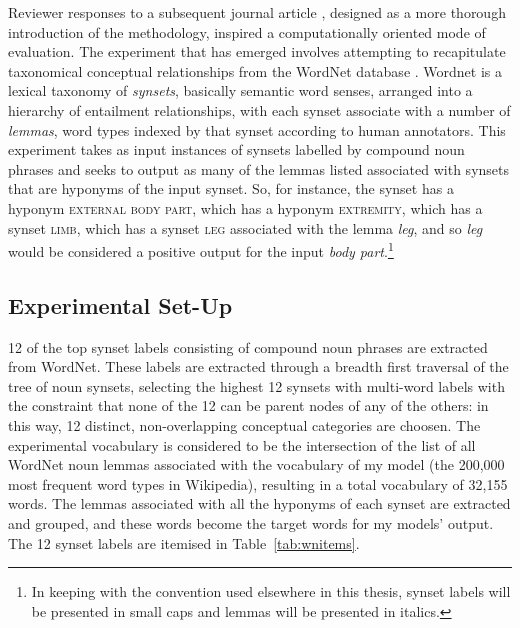 Reviewer responses to a subsequent journal article \citep{McGregorEA2015c}, designed as a more thorough introduction of the methodology, inspired a computationally oriented mode of evaluation.  The experiment that has emerged involves attempting to recapitulate taxonomical conceptual relationships from the WordNet database \citep{Fellbaum1998}.  Wordnet is a lexical taxonomy of \emph{synsets}, basically semantic word senses, arranged into a hierarchy of entailment relationships, with each synset associate with a number of \emph{lemmas}, word types indexed by that synset according to human annotators.  This experiment takes as input instances of synsets labelled by compound noun phrases and seeks to output as many of the lemmas listed associated with synsets that are hyponyms of the input synset.  So, for instance, the synset  has a hyponym \textsc{external body part}, which has a hyponym \textsc{extremity}, which has a synset \textsc{limb}, which has a synset \textsc{leg} associated with the lemma \emph{leg}, and so \emph{leg} would be considered a positive output for the input \emph{body part}.\footnote{In keeping with the convention used elsewhere in this thesis, synset labels will be presented in small caps and lemmas will be presented in italics.}

\subsection{Experimental Set-Up}
12 of the top synset labels consisting of compound noun phrases are extracted from WordNet.  These labels are extracted through a breadth first traversal of the tree of noun synsets, selecting the highest 12 synsets with multi-word labels with the constraint that none of the 12 can be parent nodes of any of the others: in this way, 12 distinct, non-overlapping conceptual categories are choosen.  The experimental vocabulary is considered to be the intersection of the list of all WordNet noun lemmas associated with the vocabulary of my model (the 200,000 most frequent word types in Wikipedia), resulting in a total vocabulary of 32,155 words.  The lemmas associated with all the hyponyms of each synset are extracted and grouped, and these words become the target words for my models' output.  The 12 synset labels are itemised in Table~\ref{tab:wnitems}.

